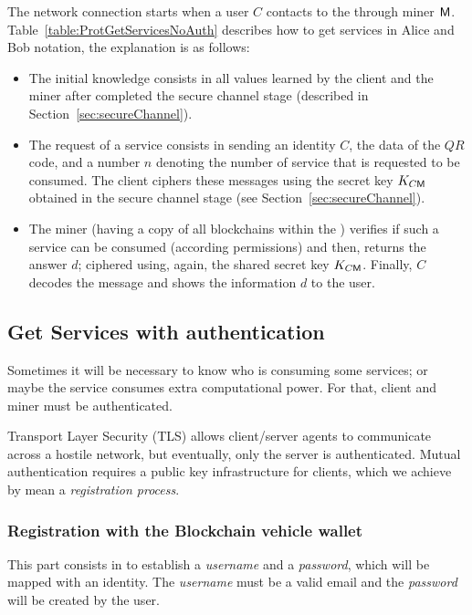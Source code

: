 The network connection starts when a user $C$ contacts to the \blockchaincarnetwork through 
miner $\textsf{M}$. Table~\ref{table:ProtGetServicesNoAuth} describes how to get services in
Alice and Bob notation, the explanation is as follows:
\begin{itemize}
  \item  The initial knowledge consists in all values learned by the client and the miner 
        after completed the secure channel stage (described in Section~\ref{sec:secureChannel}).
   \item The request of a service consists in sending an identity $C$, the data of the $QR$ code, and a 
        number $n$ denoting the number of service that is requested to be consumed. 
        The client ciphers  these messages using the secret key $K_{C\textsf{M}}$ obtained in
        the secure channel stage (see Section~\ref{sec:secureChannel}).
   \item The miner (having a copy of all blockchains within the \blockchaincarnetwork) verifies 
        if such a service can be consumed (according permissions) and then, 
        returns the answer $d$; ciphered using, again, the shared secret key $K_{C\textsf{M}}$. Finally,
        $C$ decodes the message and shows the information $d$ to the user.
\end{itemize}




\subsection{Get Services with authentication}
\label{ssec:ServAuth}
Sometimes it will be necessary to know who is consuming some services; or maybe the service consumes extra 
computational power. For that, client and miner must be authenticated. 

Transport Layer Security (TLS) allows client/server agents to communicate 
across a hostile network, but eventually, only the server is authenticated. 
Mutual authentication requires a public key infrastructure for clients, which
we achieve by mean a \textit{registration process}. 

\subsubsection{Registration with the Blockchain vehicle wallet}
\label{sec:Registration}

This part consists in to establish a \textit{username} and a \textit{password}, which
will be mapped with an identity. The \textit{username} must be a valid email and the 
\textit{password} will be created by the user.

